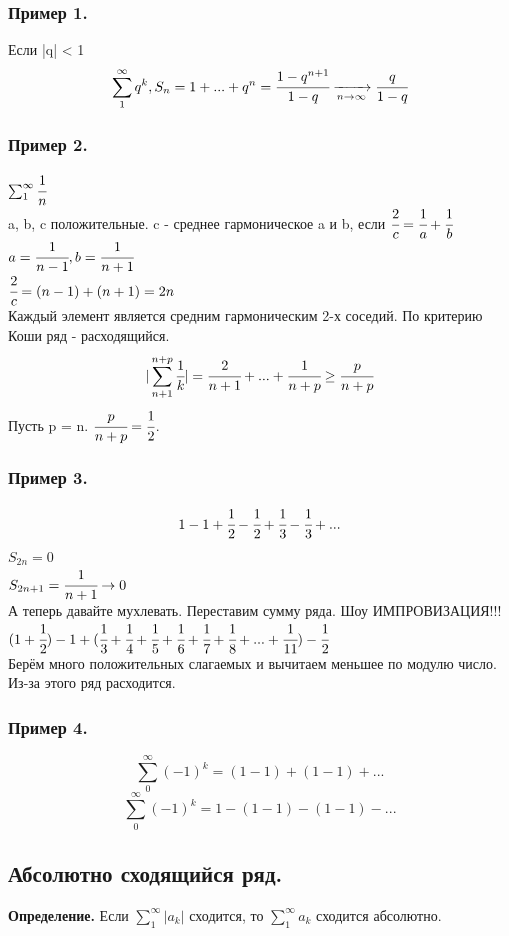 \documentclass[12pt, a4paper]{article}
\begin{document}
\begin{centering}
\subsubsection*{Пример 1.}
Если |q| < 1
\[ \sum_1^\infty q^k, S_n = 1+...+q^n = \cfrac{1-q^{n+1}}{1-q} \xrightarrow[n\to\infty]{} \cfrac{q}{1-q} \]
\subsubsection*{Пример 2.}
$\sum_1^\infty \cfrac{1}{n}$\\
a, b, c положительные. c - среднее гармоническое a и b, если $\cfrac{2}{c} = \cfrac{1}{a} + \cfrac{1}{b}$\\
$a = \cfrac{1}{n-1}, b = \cfrac{1}{n+1}$\\
$\cfrac{2}{c} = (n - 1) + (n + 1) = 2n$\\
Каждый элемент является средним гармоническим 2-х соседий. По критерию Коши ряд - расходящийся.
\[ |\sum_{n+1}^{n+p} \cfrac{1}{k}| = \cfrac{2}{n+1} + ... + \cfrac{1}{n+p} \geq \cfrac{p}{n+p}\]
Пусть p = n. $\cfrac{p}{n+p} = \cfrac{1}{2}$.
\subsubsection*{\textbf{Пример 3.}}
\[ 1 - 1 + \cfrac{1}{2} - \cfrac{1}{2} + \cfrac{1}{3} - \cfrac{1}{3} + ...\]
$S_{2n} = 0$\\
$S_{2n+1} = \cfrac{1}{n+1} \to 0$\\
А теперь давайте мухлевать. Переставим сумму ряда. Шоу ИМПРОВИЗАЦИЯ!!!\\
$(1+\cfrac{1}{2}) - 1 + (\cfrac{1}{3} + \cfrac{1}{4} +\cfrac{1}{5} + \cfrac{1}{6} + \cfrac{1}{7} + \cfrac{1}{8} + ... + \cfrac{1}{11}) - \cfrac{1}{2}$\\
Берём много положительных слагаемых и вычитаем меньшее по модулю число. Из-за этого ряд расходится.
\subsubsection*{\textbf{Пример 4.}}
\[ \sum^\infty_{0} (-1)^k = (1-1) + (1-1) + ... \]
\[ \sum^\infty_{0} (-1)^k = 1 - (1-1) - (1-1) - ... \]

\subsection{Абсолютно сходящийся ряд.}
\begin{tcolorbox}
    \textbf{Определение.} Если $\sum^\infty_{1} |a_k|$ сходится, то $\sum^\infty_{1} a_k$ сходится абсолютно.
\end{tcolorbox}

\end{centering}
\end{document}
